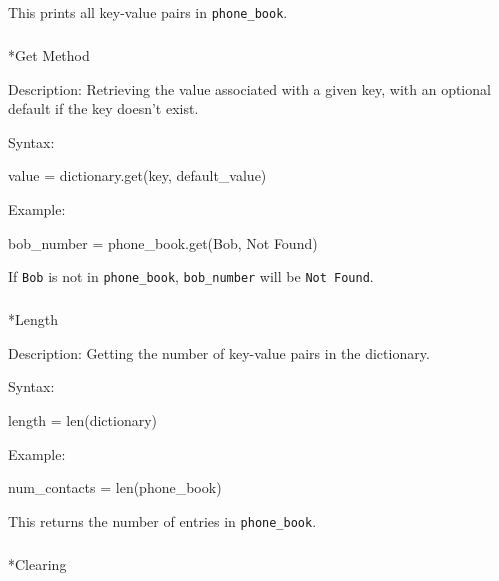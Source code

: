 \documentclass[
  letterpaper,
  DIV=11,
  numbers=noendperiod]{scrreprt}
\makeatletter
\let\oldsubparagraph\subparagraph
\renewcommand{\subparagraph}{
    \@ifstar
      \xxxSubParagraphStar
      \xxxSubParagraphNoStar
  }
\newcommand{\xxxSubParagraphStar}[1]{\oldsubparagraph*{#1}\mbox{}}
\newcommand{\xxxSubParagraphNoStar}[1]{\oldsubparagraph{#1}\mbox{}}
\newenvironment{Shaded}{\begin{snugshade}}{\end{snugshade}}
\newcommand{\NormalTok}[1]{\textcolor[rgb]{0.00,0.23,0.31}{#1}}
\makeatother
\begin{document}
This prints all key-value pairs in \texttt{phone\_book}.

\subparagraph*{Get Method}\label{get-method}

Description: Retrieving the value associated with a given key, with an
optional default if the key doesn't exist.

Syntax:

\begin{Shaded}
\begin{Highlighting}[]
\NormalTok{value = dictionary.get(key, default\_value)}
\end{Highlighting}
\end{Shaded}

Example:

\begin{Shaded}
\begin{Highlighting}[]
\NormalTok{bob\_number = phone\_book.get(\textquotesingle{}Bob\textquotesingle{}, \textquotesingle{}Not Found\textquotesingle{})}
\end{Highlighting}
\end{Shaded}

If \texttt{\textquotesingle{}Bob\textquotesingle{}} is not in
\texttt{phone\_book}, \texttt{bob\_number} will be
\texttt{\textquotesingle{}Not\ Found\textquotesingle{}}.

\subparagraph*{Length}\label{length}

Description: Getting the number of key-value pairs in the dictionary.

Syntax:

\begin{Shaded}
\begin{Highlighting}[]
\NormalTok{length = len(dictionary)}
\end{Highlighting}
\end{Shaded}

Example:

\begin{Shaded}
\begin{Highlighting}[]
\NormalTok{num\_contacts = len(phone\_book)}
\end{Highlighting}
\end{Shaded}

This returns the number of entries in \texttt{phone\_book}.

\subparagraph*{Clearing}\label{clearing}
\end{document}
